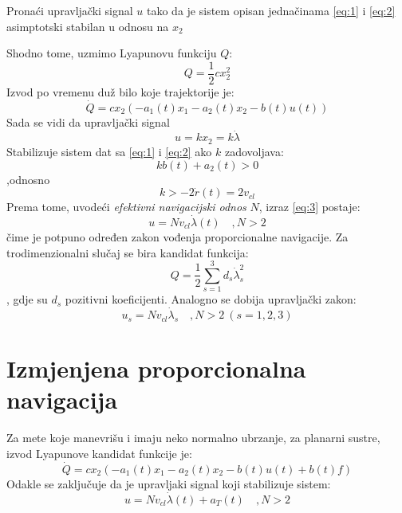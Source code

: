 \begin{tcolorbox}
    Pronaći upravljački signal $u$ tako da je sistem opisan jednačinama \ref{eq:1} i \ref{eq:2} asimptotski stabilan u odnosu na $x_2$
\end{tcolorbox}
Shodno tome, uzmimo Lyapunovu funkciju $Q$:
\begin{equation}
    Q=\frac{1}{2}cx_2^2
\end{equation}
Izvod po vremenu duž bilo koje trajektorije je:
\begin{equation}
    \dot{Q}=cx_2(-a_1(t)x_1-a_2(t)x_2-b(t)u(t))
\end{equation}
Sada se vidi da upravljački signal 
\begin{equation}
    u=kx_2=k\dot{\lambda}
    \label{eq:3}
\end{equation}
Stabilizuje sistem dat sa \ref{eq:1} i \ref{eq:2} ako $k$ zadovoljava:
\begin{equation}
    kb(t)+a_2(t)>0
\end{equation}
,odnosno \begin{equation}
    k>-2\dot{r}(t)=2v_{cl}
\end{equation}
Prema tome, uvodeći \textit{efektivni navigacijski odnos} $N$, izraz \ref{eq:3} postaje:
\begin{equation}
    u=Nv_{cl}\dot{\lambda}(t) \quad ,N>2
\end{equation}
čime je potpuno određen zakon vođenja proporcionalne navigacije.
Za trodimenzionalni slučaj se bira kandidat funkcija:
\begin{equation}
    Q=\frac{1}{2}\sum_{s=1}^3d_s\dot{\lambda}_s^2
\end{equation}
, gdje su $d_s$ pozitivni koeficijenti. Analogno se dobija upravljački zakon:
\begin{equation}
    u_s=Nv_{cl}\dot{\lambda}_s \quad ,N>2\ (s=1,2,3)
\end{equation}
\section{Izmjenjena proporcionalna navigacija}
Za mete koje manevrišu i imaju neko normalno ubrzanje, za planarni sustre, izvod Lyapunove kandidat 
funkcije je:
\begin{equation}
    \dot{Q}=cx_2(-a_1(t)x_1-a_2(t)x_2-b(t)u(t)+b(t)f)
\end{equation}
Odakle se zaključuje da je upravljaki signal koji stabilizuje sistem:
\begin{equation}
    u=Nv_{cl}\dot{\lambda}(t)+a_T(t) \quad ,N>2
\end{equation}
